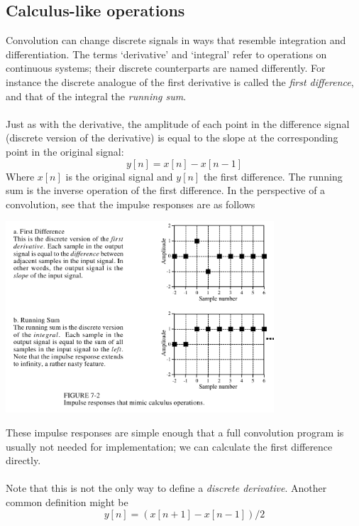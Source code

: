 \documentclass{report}
\begin{document}
\subsection{Calculus-like operations}
Convolution can change discrete signals in ways that resemble integration and differentiation. 
The terms `derivative' and `integral' refer to operations on continuous systems; their discrete counterparts are
named differently. For instance the discrete analogue of
the first derivative is called the \textit{first difference}, and that of the integral the \textit{running sum}.\\
\vspace{1mm}\\
Just as with the derivative, the amplitude of each point in the difference signal 
(discrete version of the derivative) is equal to the slope at the corresponding point in the original signal:
\begin{equation*}
y[n]=x[n]-x[n-1]
\end{equation*}
Where $x[n]$ is the original signal and $y[n]$ the first difference.
The running sum is the inverse operation of the first difference. In the perspective of a convolution, see that
the impulse responses are as follows
\begin{center}
\includegraphics[width=10cm]{a10}\\
\end{center}
These impulse responses are simple enough that a full convolution program is usually not needed for implementation;
we can calculate the first difference directly.\\
\vspace{1mm}\\
Note that this is not the only way to define a \textit{discrete derivative}. Another common definition might be
\begin{equation*}
y[n]=(x[n+1]-x[n-1])/2
\end{equation*}
\end{document}

